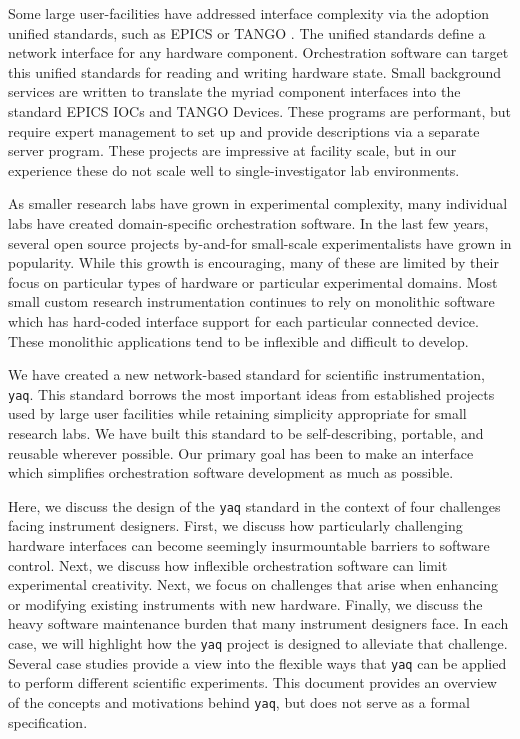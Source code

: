 \documentclass[aip, amsmath, amssymb, reprint,]{revtex4-1}
\newcommand\yaq{\texttt{yaq}}
\begin{document}
Some large user-facilities have addressed interface complexity via the adoption unified standards, such as EPICS \cite{DalesioLR1991a} or TANGO \cite{AGotz1999TANGOA}.
The unified standards define a network interface for any hardware component.
Orchestration software can target this unified standards for reading and writing hardware state.
Small background services are written to translate the myriad component interfaces into the standard EPICS IOCs and TANGO Devices.
These programs are performant, but require expert management to set up and provide descriptions via a separate server program.
These projects are impressive at facility scale, but in our experience these do not scale well to single-investigator lab environments.

As smaller research labs have grown in experimental complexity, many individual labs have created domain-specific orchestration software.
In the last few years, several open source projects by-and-for small-scale experimentalists have grown in popularity\cite{WeberSebastien2021a,Bogdanowicz2022,trspectrometer,Koerner_2019,Campagnola_2014,pymeasure,Giesbrecht_2022,pylablib}.
While this growth is encouraging, many of these are limited by their focus on particular types of hardware or particular experimental domains.
Most small custom research instrumentation continues to rely on monolithic software which has hard-coded interface support for each particular connected device.
These monolithic applications tend to be inflexible and difficult to develop.

We have created a new network-based standard for scientific instrumentation, \yaq{}.
This standard borrows the most important ideas from established projects used by large user facilities while retaining simplicity appropriate for small research labs.
We have built this standard to be self-describing, portable, and reusable wherever possible.
Our primary goal has been to make an interface which simplifies orchestration software development as much as possible.

Here, we discuss the design of the \yaq{} standard in the context of four challenges facing instrument designers.
First, we discuss how particularly challenging hardware interfaces can become seemingly insurmountable barriers to software control.
Next, we discuss how inflexible orchestration software can limit experimental creativity.
Next, we focus on challenges that arise when enhancing or modifying existing instruments with new hardware.
Finally, we discuss the heavy software maintenance burden that many instrument designers face.
In each case, we will highlight how the \yaq{} project is designed to alleviate that challenge.
Several case studies provide a view into the flexible ways that \yaq{} can be applied to perform different scientific experiments.
This document provides an overview of the concepts and motivations behind \yaq{}, but does not serve as a formal specification\cite{yaq_fyi}.
\end{document}
